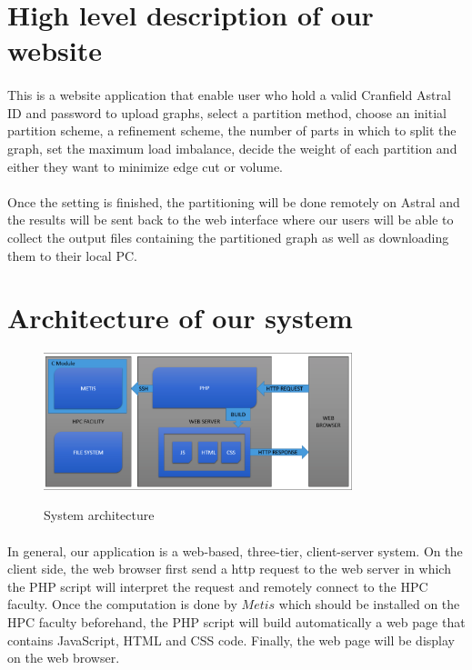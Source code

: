 \documentclass{cranfieldChart}
\begin{document}
\section{High level description of our website}
\paragraph{}
This is a website application that enable user who hold a valid Cranfield Astral ID and password to upload graphs, select a partition method, choose an initial partition scheme, a refinement scheme, the number of parts in which to split the graph, set the maximum load imbalance, decide the weight of each partition and either they want to minimize edge cut or volume. 
\paragraph{}
Once the setting is finished, the partitioning will be done remotely on Astral and the results will be sent back to the web interface where our users will be able to collect the output files containing the partitioned graph as well as downloading them to their local PC. 

\section{Architecture of our system}

\begin{figure}[h]
\centering
\includegraphics[width=0.8\textwidth]{ressources/architect}
\label{architect}
\caption{System architecture}
\end{figure}

\paragraph{}
In general, our application is a web-based, three-tier, client-server system. On the client side, the web browser first send a http request to the web server in which the PHP script will interpret the request and remotely connect to the HPC faculty. Once the computation is done by $Metis$ which should be installed on the HPC faculty beforehand, the PHP script will build automatically a web page that contains JavaScript, HTML and CSS code. Finally, the web page will be display on the web browser. 
\end{document}
